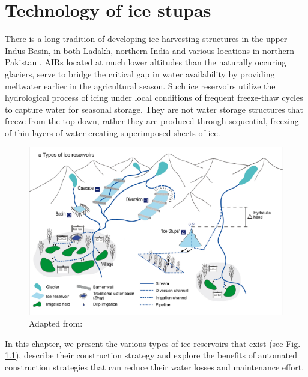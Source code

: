 \chapter{Technology of ice stupas}
\label{chap:tech}


There is a long tradition of developing ice harvesting structures in the upper Indus Basin, in both Ladakh,
northern India \citep{labbalTraditionalOasesLadakh2000, nusserIrrigationDevelopmentUpper2012} and various
locations in northern Pakistan \citep{kreutzmannScarcityOpulenceWater2011}. AIRs located at much lower altitudes
than the naturally occuring glaciers, serve to bridge the critical gap in water availability by providing
meltwater earlier in the agricultural season. Such ice reservoirs utilize the hydrological process of icing
under local conditions of frequent freeze-thaw cycles to capture water for seasonal storage. They are not water
storage structures that freeze from the top down, rather they are produced through sequential, freezing of thin
layers of water creating superimposed sheets of ice.

\begin{figure}[htb]
\centering
\includegraphics[width=12cm]{figs/AIR_designs}
\caption{ Adapted from: \cite{nusserSociohydrologyArtificialGlaciers2019}}
\label{fig:AIRdesigns}
\end{figure}

In this chapter, we present the various types of ice reservoirs that exist (see Fig. \ref{fig:AIRdesigns}),
describe their construction strategy and explore the benefits of automated construction strategies that can
reduce their water losses and maintenance effort. 

